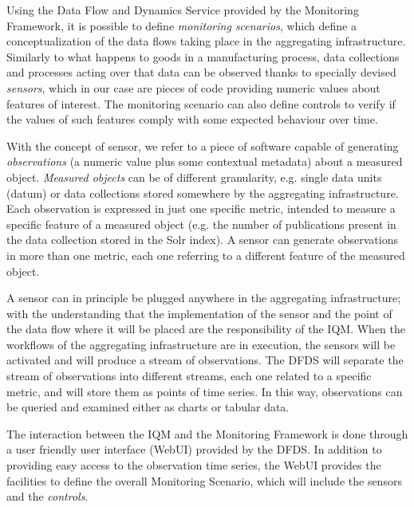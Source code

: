 \documentclass[amsthm,ebook]{saparticle}
\begin{document}
\vspace{5pt}
Using the Data Flow and Dynamics Service provided by the Monitoring Framework, it is possible to define \textit{monitoring scenarios}, which define a conceptualization of the data flows taking place in the aggregating infrastructure. Similarly to what happens to goods in a manufacturing process, data collections and processes acting over that data can be observed thanks to specially devised \textit{sensors}, which in our case are pieces of code providing numeric values about features of interest. The monitoring scenario can also define controls to verify if the values of such features comply with some expected behaviour over time.

\vspace{5pt}
With the concept of sensor, we refer to a piece of software capable of generating \textit{observations} (a numeric value plus some contextual metadata) about a measured object. \textit{Measured objects} can be of different granularity, e.g. single data units (datum) or data collections stored somewhere by the aggregating infrastructure. Each observation is expressed in just one specific metric, intended to measure a specific feature of a measured object (e.g. the number of publications present in the data collection stored in the Solr index). A sensor can generate observations in more than one metric, each one referring to a different feature of the measured object. 

\vspace{5pt}
A sensor can in principle be plugged anywhere in the aggregating infrastructure; with the understanding that the implementation of the sensor and the point of the data flow where it will be placed are the responsibility of the IQM. When the workflows of the aggregating infrastructure are in execution, the sensors will be activated and will produce a stream of observations. The DFDS will separate the stream of observations into different streams, each one related to a specific metric, and will store them as points of time series. In this way, observations can be queried and examined either as charts or tabular data.

\vspace{5pt}
The interaction between the IQM and the Monitoring Framework is done through a user friendly user interface (WebUI) provided by the DFDS. In addition to providing easy access to the observation time series, the WebUI provides the facilities to define the overall Monitoring Scenario, which will include the sensors and the \emph{controls}. 
\end{document}
